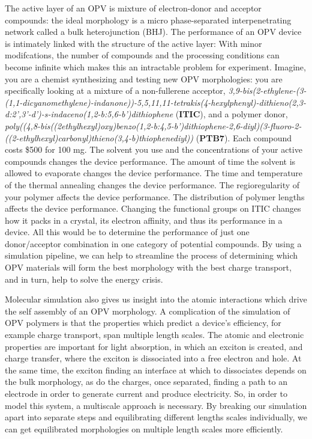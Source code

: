 The active layer of an OPV is mixture of electron-donor and acceptor compounds: the ideal morphology is a micro phase-separated interpenetrating network called a bulk heterojunction (BHJ).
The performance of an OPV device is intimately linked with the structure of the active layer:
With minor modifcations, the number of compounds and the processing conditions can become infinite which makes this an intractable problem for experiment.
Imagine, you are a chemist synthesizing and testing new OPV morphologies: you are specifically looking at a mixture of a non-fullerene acceptor, \textit{3,9-bis(2-ethylene-(3-(1,1-dicyanomethylene)-indanone))-5,5,11,11-tetrakis(4-hexylphenyl)-dithieno(2,3-d:2',3'-d')-s-indaceno(1,2-b:5,6-b')dithiophene} (\textbf{ITIC}), and a polymer donor, \textit{poly((4,8-bis((2ethylhexyl)oxy)benzo(1,2-b:4,5-b')dithiophene-2,6-diyl)(3-fluoro-2-((2-ethylhexyl)carbonyl)thieno(3,4-b)thiophenediyl))} (\textbf{PTB7}). 
Each compound costs \$500 for 100 mg\cite{sigmaaldrich}.
The solvent you use and the concentrations of your active compounds changes the device performance\cite{Hoppe2004a}.
The amount of time the solvent is allowed to evaporate changes the device performance\cite{Li2007}.
The time and temperature of the thermal annealing changes the device performance\cite{Ma2005}.
The regioregularity of your polymer affects the device performance\cite{Kim2006}.
The distribution of polymer lengths affects the device performance\cite{Zhao2013b}.
Changing the functional groups on ITIC changes how it packs in a crystal, its electron affinity, and thus its performance in a device\cite{Swick2019a}.
All this would be to determine the performance of just one donor/acceptor combination in one category of potential compounds\cite{Dou2013}.
By using a simulation pipeline, we can help to streamline the process of determining which OPV materials will form the best morphology with the best charge transport, and in turn, help to solve the energy crisis.

Molecular simulation also gives us insight into the atomic interactions which drive the self assembly of an OPV morphology.
A complication of the simulation of OPV polymers is that the properties which predict a device's efficiency, for example charge transport, span multiple length scales.
The atomic and electronic properties are important for light absorption, in which an exciton is created, and charge transfer, where the exciton is dissociated into a free electron and hole\cite{Scharber2006a,Hoppe2004,Mazzio2015}.
At the same time, the exciton finding an interface at which to dissociates depends on the bulk morphology, as do the charges, once separated, finding a path to an electrode in order to generate current and produce electricity.
So, in order to model this system, a multiscale approach is necessary.
By breaking our simulation apart into separate steps and equilibrating different lengths scales individually, we can get equilibrated morphologies on multiple length scales more efficiently.

